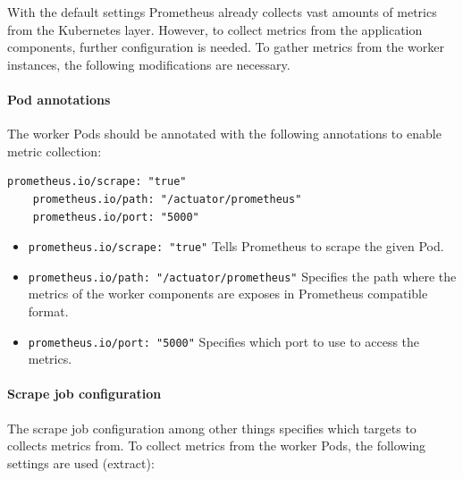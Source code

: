 
With the default settings Prometheus already collects vast amounts of metrics from the Kubernetes layer. However, to collect metrics from the application components, further configuration is needed. To gather metrics from the worker instances, the following modifications are necessary.

\paragraph{Pod annotations} The worker Pods should be annotated with the following annotations to enable metric collection:

\vspace{0.5cm}
\begin{minipage}{\linewidth}
	\begin{lstlisting}[caption={Worker annotation to enable monitoring}, label={lst:worker-annotation-monitoring}]
	prometheus.io/scrape: "true"
	prometheus.io/path: "/actuator/prometheus"
	prometheus.io/port: "5000"
	\end{lstlisting}
\end{minipage}

\begin{itemize}
	\item \texttt{prometheus.io/scrape: "true"} Tells Prometheus to scrape the given Pod.
	\item \texttt{prometheus.io/path: "/actuator/prometheus"} Specifies the path where the metrics of the worker components are exposes in Prometheus compatible format.
	\item \texttt{prometheus.io/port: "5000"} Specifies which port to use to access the metrics.
\end{itemize}

\paragraph{Scrape job configuration} The scrape job configuration among other things specifies which targets to collects metrics from. To collect metrics from the worker Pods, the following settings are used (extract):

